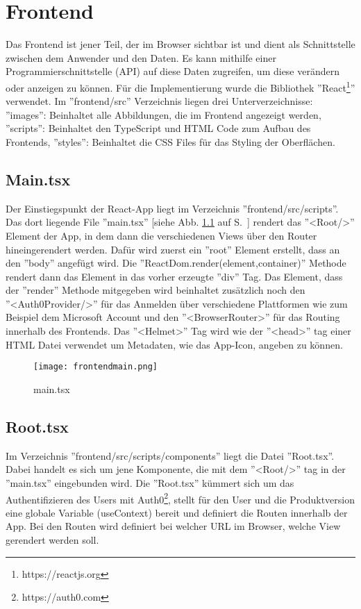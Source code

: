 \chapter{Frontend}
Das Frontend ist jener Teil, der im Browser sichtbar ist und dient als Schnittstelle zwischen dem Anwender und den Daten. Es kann mithilfe einer Programmierschnittstelle (API) auf diese Daten zugreifen, um diese verändern oder anzeigen zu können. Für die Implementierung wurde die Bibliothek ''React\footnote{https://reactjs.org}'' verwendet. Im ''frontend/src'' Verzeichnis liegen drei Unterverzeichnisse: ''images'': Beinhaltet alle Abbildungen, die im Frontend angezeigt werden, ''scripts'': Beinhaltet den TypeScript und HTML Code zum Aufbau des Frontends, ''styles'': Beinhaltet die CSS Files für das Styling der Oberflächen. 

\section{Main.tsx}
Der Einstiegspunkt der React-App liegt im Verzeichnis ''frontend/src/scripts''. Das dort liegende File ''main.tsx'' [siehe Abb. \ref{fig: frontendmain} auf S.~\pageref{fig: frontendmain}] rendert das ''<Root/>'' Element der App, in dem dann die verschiedenen Views über den Router hineingerendert werden. Dafür wird zuerst ein ''root'' Element erstellt, dass an den ''body'' angefügt wird. Die ''ReactDom.render(element,container)'' Methode rendert dann das Element in das vorher erzeugte ''div'' Tag. Das Element, dass der ''render'' Methode mitgegeben wird beinhaltet zusätzlich noch den ''<Auth0Provider/>'' für das Anmelden über verschiedene Plattformen wie zum Beispiel dem Microsoft Account und den ''<BrowserRouter>'' für das Routing innerhalb des Frontends. Das ''<Helmet>'' Tag wird wie der ''<head>'' tag einer HTML Datei verwendet um Metadaten, wie das App-Icon, angeben zu können.

\begin{figure}[h]
    \centering
    \texttt{[image: frontendmain.png]}
    \caption{main.tsx}
    \label{fig: frontendmain}
\end{figure}

\section{Root.tsx}
Im Verzeichnis ''frontend/src/scripts/components'' liegt die Datei ''Root.tsx''. Dabei handelt es sich um jene Komponente, die mit dem ''<Root/>'' tag in der ''main.tsx'' eingebunden wird. Die ''Root.tsx'' kümmert sich um das Authentifizieren des Users mit Auth0\footnote{https://auth0.com}, stellt für den User und die Produktversion eine globale Variable (useContext) bereit und definiert die Routen innerhalb der App. Bei den Routen wird definiert bei welcher URL im Browser, welche View gerendert werden soll.

